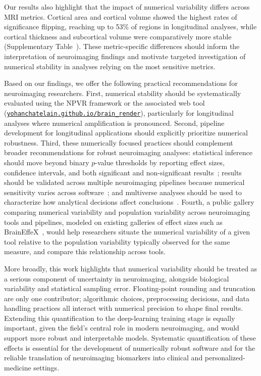 Our results also highlight that the impact of numerical variability differs
across MRI metrics. Cortical area and cortical volume showed the highest
rates of significance flipping, reaching up to 53\% of regions in longitudinal
analyses, while cortical thickness and subcortical volume were comparatively
more stable (Supplementary Table~).
These metric-specific differences should inform the interpretation of
neuroimaging findings and motivate targeted investigation of numerical
stability in analyses relying on the most sensitive metrics.

Based on our findings, we offer the following practical recommendations for
neuroimaging researchers. First, numerical stability should be systematically
evaluated using the NPVR framework or the associated web tool
(\href{https://yohanchatelain.github.io/brain_render/}{\nolinkurl{yohanchatelain.github.io/brain_render}}),
particularly for longitudinal analyses where numerical amplification is
pronounced. Second, pipeline development for longitudinal applications should
explicitly prioritize numerical robustness. Third, these numerically focused
practices should complement broader recommendations for robust neuroimaging
analyses: statistical inference should move beyond binary $p$-value thresholds
by reporting effect sizes, confidence intervals, and both significant and
non-significant results~\cite{amrhein2019retire}; results should be validated
across multiple neuroimaging pipelines because numerical sensitivity varies
across software~\cite{bhagwat2021understanding,mirhakimi2025numerical}; and
multiverse analyses should be used to characterize how analytical decisions
affect conclusions~\cite{lefortbesnard2025sdma}. Fourth, a public gallery
comparing numerical variability and population variability across neuroimaging
tools and pipelines, modeled on existing galleries of effect sizes such as
BrainEffeX~\cite{shearer2025braineffex}, would help researchers situate the
numerical variability of a given tool relative to the population variability
typically observed for the same measure, and compare this relationship across
tools.

More broadly, this work highlights that numerical variability should be
treated as a serious component of uncertainty in neuroimaging, alongside
biological variability and statistical sampling error. Floating-point rounding
and truncation are only one contributor; algorithmic choices, preprocessing
decisions, and data handling practices all interact with numerical precision to
shape final results. Extending this quantification to the deep-learning
training stage is equally important, given the field's central role in modern
neuroimaging, and would support more robust and interpretable models.
Systematic quantification of these effects is essential for the development of
numerically robust software and for the reliable translation of neuroimaging
biomarkers into clinical and personalized-medicine settings.

